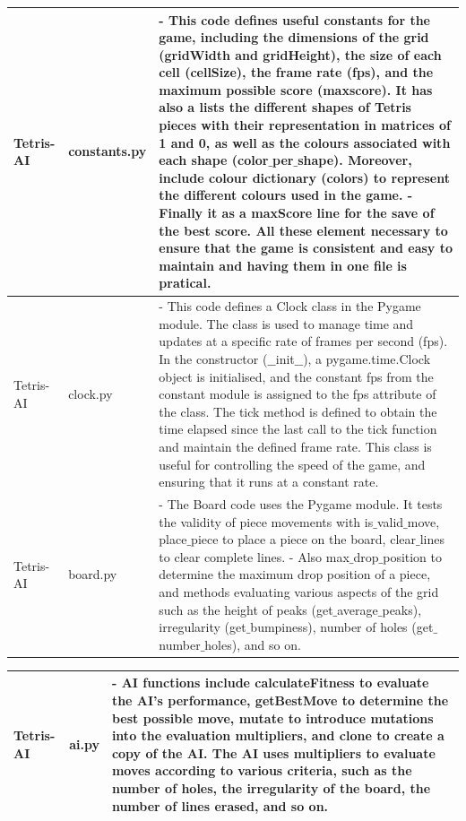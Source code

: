 \documentclass[conference]{IEEEtran}
\begin{document}
\begin{center}
\begin{tabular}{| m{1.3cm} | m{1.7cm} | m{4.7cm} | } 

    Tetris-AI & 
    constants.py &
    - This code defines useful constants for the game, including the dimensions of the grid (gridWidth and gridHeight), the size of each cell (cellSize), the frame rate (fps), and the maximum possible score (maxscore). It has also a lists the different shapes of Tetris pieces with their representation in matrices of 1 and 0, as well as the colours associated with each shape (color$\_$per$\_$shape). Moreover, include colour dictionary (colors) to represent the different colours used in the game.
    \newline-Finally it as a maxScore line for the save of the best score. All these element necessary to ensure that the game is consistent and easy to maintain and having them in one file is pratical. \\
    \hline
    Tetris-AI & 
    clock.py & 
    - This code defines a Clock class in the Pygame module. The class is used to manage time and updates at a specific rate of frames per second (fps). In the constructor ($\_$$\_$init$\_$$\_$), a pygame.time.Clock object is initialised, and the constant fps from the constant module is assigned to the fps attribute of the class. The tick method is defined to obtain the time elapsed since the last call to the tick function and maintain the defined frame rate. This class is useful for controlling the speed of the game, and ensuring that it runs at a constant rate. \\
     \hline
     Tetris-AI & 
    board.py & 
    - The Board code uses the Pygame module. It tests the validity of piece movements with is$\_$valid$\_$move, place$\_$piece to place a piece on the board, clear$\_$lines to clear complete lines.
    - Also max$\_$drop$\_$position to determine the maximum drop position of a piece, and methods evaluating various aspects of the grid such as the height of peaks (get$\_$average$\_$peaks), irregularity (get$\_$bumpiness), number of holes (get$\_$number$\_$holes), and so on. \\

\end{tabular}
\end{center}


\begin{center}
\begin{tabular}{ | m{1.3cm} | m{1.7cm} | m{4.7cm} | } 
    Tetris-AI & 
    ai.py & 
    -  AI functions include calculateFitness to evaluate the AI's performance, getBestMove to determine the best possible move, mutate to introduce mutations into the evaluation multipliers, and clone to create a copy of the AI. The AI uses multipliers to evaluate moves according to various criteria, such as the number of holes, the irregularity of the board, the number of lines erased, and so on. \\
    \hline
\end{tabular}
\end{center}
\end{document}
